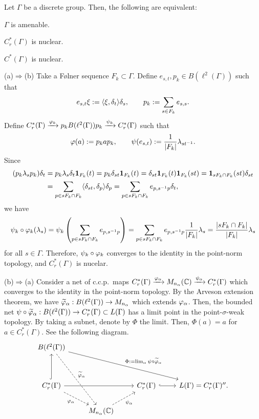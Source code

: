 \documentclass{../../../small}
\begin{document}
\begin{thm}[Nuclearity]
Let $\Gamma$ be a discrete group.
Then, the following are equivalent:
\begin{parts}
\item $\Gamma$ is amenable.
\item $C_r^*(\Gamma)$ is nuclear.
\item $C^*(\Gamma)$ is nuclear.
\end{parts}
\end{thm}
\begin{pf}
(a)$\Rightarrow$(b)
Take a F\o lner sequence $F_k\subset\Gamma$.
Define $e_{s,t},p_k\in B(\ell^2(\Gamma))$ such that
\[e_{s,t}\xi:=\langle\xi,\delta_t\rangle\delta_s,\qquad p_k:=\sum_{s\in F_k}e_{s,s}.\]
Define $C_r^*(\Gamma)\xrightarrow{\varphi_k}p_kB(\ell^2(\Gamma))p_k\xrightarrow{\psi_k}C_r^*(\Gamma)$ such that
\[\varphi(a):=p_kap_k,\qquad\psi(e_{s,t}):=\frac1{|F_k|}\lambda_{st^{-1}}.\]
Since
\begin{align*}
(p_k\lambda_sp_k)\delta_t
&=p_k\lambda_s\delta_t\mathbf{1}_{F_k}(t)
=p_k\delta_{st}\mathbf{1}_{F_k}(t)
=\delta_{st}\mathbf{1}_{F_k}(t)\mathbf{1}_{F_k}(st)
=\mathbf{1}_{sF_k\cap F_k}(st)\delta_{st}\\
&=\sum_{p\in sF_k\cap F_k}\langle\delta_{st},\delta_p\rangle\delta_p
=\sum_{p\in sF_k\cap F_k}e_{p,s^{-1}p}\delta_t,
\end{align*}
we have
\[\psi_k\circ\varphi_k(\lambda_s)=\psi_k\left(\sum_{p\in sF_k\cap F_k}e_{p,s^{-1}p}\right)=\sum_{p\in sF_k\cap F_k}e_{p,s^{-1}p}\frac1{|F_k|}\lambda_s=\frac{|sF_k\cap F_k|}{|F_k|}\lambda_s\]
for all $s\in\Gamma$.
Therefore, $\psi_k\circ\varphi_k$ converges to the identity in the point-norm topology, and $C_r^*(\Gamma)$ is nucelar.

(b)$\Rightarrow$(a)
Consider a net of c.c.p.~maps $C_r^*(\Gamma)\xrightarrow{\varphi_\alpha}M_{n_\alpha}(\mathbb{C})\xrightarrow{\psi_\alpha}C_r^*(\Gamma)$ which converges to the identity in the point-norm topology.
By the Arveson extension theorem, we have $\widetilde{\varphi}_\alpha:B(\ell^2(\Gamma))\to M_{n_\alpha}$ which extends $\varphi_\alpha$.
Then, the bounded net $\psi\circ\widetilde{\varphi}_\alpha:B(\ell^2(\Gamma))\to C_r^*(\Gamma)\subset L(\Gamma)$ has a limit point in the point-$\sigma$-weak topology.
By taking a subnet, denote by $\Phi$ the limit.
Then, $\Phi(a)=a$ for $a\in C_r^*(\Gamma)$.
See the following diagram.
\[\begin{tikzcd}
B(\ell^2(\Gamma)) \ar[dashed]{rddd}{\tilde\f_\alpha}\ar{rrrdd}{\Phi:=\lim_\alpha\psi\circ\tilde\f_\alpha}&&&\\
&&&\\
C_r^*(\Gamma)\ar{rr}\ar[swap,dashed]{rd}{\f_\alpha}\ar[hook]{uu}&&C_r^*(\Gamma)\ar[hook]{r}&L(\Gamma)=C_r^*(\Gamma)''.\\
&M_{n_\alpha}(\C)\ar[swap,dashed]{ur}{\psi_\alpha}&&
\end{tikzcd}\]


\end{pf}
\end{document}
